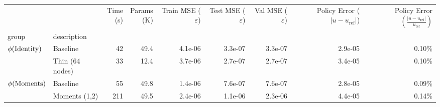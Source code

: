 \begin{tabular}{llrrrrrrr}
\toprule
                      &                                               & \shortstack{Time \\ (s)} & \shortstack{Params\\ (K)} & \shortstack{Train MSE \\ ($\varepsilon$)} & \shortstack{Test MSE \\ ($\varepsilon$)} & \shortstack{Val MSE \\ ($\varepsilon$)} & \shortstack{Policy Error \\ ($|u - u_{\text{ref}}|$)} & \shortstack{Policy Error\\ $\left(\frac{|u - u_{\text{ref}}|}{u_{\text{ref}}}\right)$} \\
group & description &                          &                           &                                           &                                          &                                         &                                                       &                                                                                        \\
\midrule
\multirow{2}{*}{$\phi(\textup{Identity})$} & Baseline &                       42 &                      49.4 &                                   4.1e-06 &                                  3.3e-07 &                                 3.3e-07 &                                            2.9e-05 &                                             0.10\% \\
                      & Thin (64 nodes) &                       33 &                      12.4 &                                   3.7e-06 &                                  2.7e-07 &                                 2.7e-07 &                                            3.4e-05 &                                             0.10\% \\
\cline{1-9}
\multirow{4}{*}{$\phi(\textup{Moments})$} & Baseline &                       55 &                      49.8 &                                   1.4e-06 &                                  7.6e-07 &                                 7.6e-07 &                                            2.8e-05 &                                             0.09\% \\
                      & Moments (1,2) &                      211 &                      49.5 &                                   2.4e-06 &                                  1.1e-06 &                                 2.3e-06 &                                            4.4e-05 &                                             0.14\% \\

\end{tabular}
